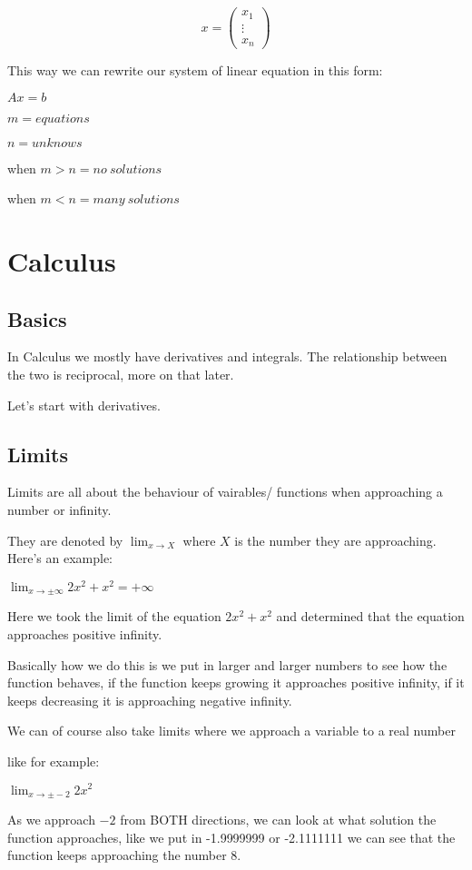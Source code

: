 \documentclass{article}
\begin{document}
$$x=\begin{pmatrix} x_1 \\ \vdots \\x_n \end{pmatrix}$$

This way we can rewrite our system of linear equation in this
form:

$Ax = b$

$m = equations$

$n = unknows$

when $m > n = no\ solutions$

when $m < n = many\ solutions$


\section{Calculus}
\subsection{Basics}
In Calculus we mostly have derivatives and integrals. The relationship between the two is
reciprocal, more on that later.

Let's start with derivatives.

\subsection{Limits}
Limits are all about the behaviour of vairables/ functions when approaching
a number or infinity.

They are denoted by $ \lim_{x \rightarrow X} $
where $X$ is the number they are approaching.
Here's an example:

$\lim_{x \rightarrow \pm \infty} 2x ^2 + x^2 = + \infty$

Here we took the limit of the equation $2x^2 + x^2$ and determined that the
equation approaches positive infinity.

Basically how we do this is we put in larger and larger numbers to see how the
function behaves, if the function keeps growing it approaches positive infinity,
if it keeps decreasing it is approaching negative infinity.

We can of course also take limits where we approach a variable to a real number

like for example:

$\lim_{x \rightarrow \pm -2} 2x ^2$

As we approach $-2$ from BOTH directions, we can look at what solution the function approaches,
like we put in -1.9999999 or -2.1111111 we can see that the function keeps approaching the
number 8.
\end{document}
